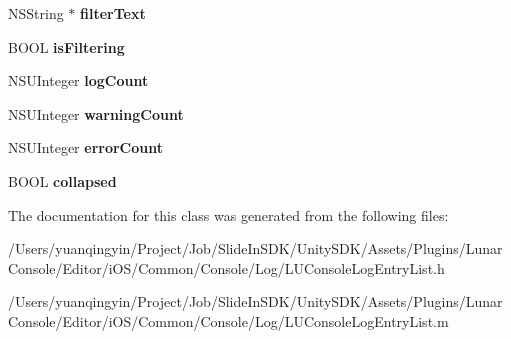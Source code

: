 \begin{DoxyCompactItemize}
N\+S\+String $\ast$ {\bfseries filter\+Text}
\item 
\mbox{\label{interface_l_u_console_log_entry_list_af06bef87938ce8032eeb37f0d8704f66}} 
B\+O\+OL {\bfseries is\+Filtering}
\item 
\mbox{\label{interface_l_u_console_log_entry_list_a662b624e75b3272b19fbf49f3c4d252e}} 
N\+S\+U\+Integer {\bfseries log\+Count}
\item 
\mbox{\label{interface_l_u_console_log_entry_list_a0d9fc061cef426585b52833f317a205c}} 
N\+S\+U\+Integer {\bfseries warning\+Count}
\item 
\mbox{\label{interface_l_u_console_log_entry_list_a8aaac33e30c0e8c1dd59e1f44849c07c}} 
N\+S\+U\+Integer {\bfseries error\+Count}
\item 
\mbox{\label{interface_l_u_console_log_entry_list_a5e8015a1b6f6c42b8462a843799e5166}} 
B\+O\+OL {\bfseries collapsed}
\end{DoxyCompactItemize}


The documentation for this class was generated from the following files\+:\begin{DoxyCompactItemize}
\item 
/\+Users/yuanqingyin/\+Project/\+Job/\+Slide\+In\+S\+D\+K/\+Unity\+S\+D\+K/\+Assets/\+Plugins/\+Lunar\+Console/\+Editor/i\+O\+S/\+Common/\+Console/\+Log/L\+U\+Console\+Log\+Entry\+List.\+h\item 
/\+Users/yuanqingyin/\+Project/\+Job/\+Slide\+In\+S\+D\+K/\+Unity\+S\+D\+K/\+Assets/\+Plugins/\+Lunar\+Console/\+Editor/i\+O\+S/\+Common/\+Console/\+Log/L\+U\+Console\+Log\+Entry\+List.\+m\end{DoxyCompactItemize}
